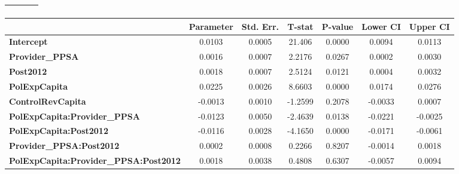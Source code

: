 \begin{center}
\begin{tabular}{lclc}
\textbf{}                                     &                    & \textbf{                     }   &                  \\
\bottomrule
\end{tabular}
\begin{tabular}{lcccccc}
                                              & \textbf{Parameter} & \textbf{Std. Err.} & \textbf{T-stat} & \textbf{P-value} & \textbf{Lower CI} & \textbf{Upper CI}  \\
\midrule
\textbf{Intercept}                            &       0.0103       &       0.0005       &      21.406     &      0.0000      &       0.0094      &       0.0113       \\
\textbf{Provider\_PPSA}                       &       0.0016       &       0.0007       &      2.2176     &      0.0267      &       0.0002      &       0.0030       \\
\textbf{Post2012}                             &       0.0018       &       0.0007       &      2.5124     &      0.0121      &       0.0004      &       0.0032       \\
\textbf{PolExpCapita}                         &       0.0225       &       0.0026       &      8.6603     &      0.0000      &       0.0174      &       0.0276       \\
\textbf{ControlRevCapita}                     &      -0.0013       &       0.0010       &     -1.2599     &      0.2078      &      -0.0033      &       0.0007       \\
\textbf{PolExpCapita:Provider\_PPSA}          &      -0.0123       &       0.0050       &     -2.4639     &      0.0138      &      -0.0221      &      -0.0025       \\
\textbf{PolExpCapita:Post2012}                &      -0.0116       &       0.0028       &     -4.1650     &      0.0000      &      -0.0171      &      -0.0061       \\
\textbf{Provider\_PPSA:Post2012}              &       0.0002       &       0.0008       &      0.2266     &      0.8207      &      -0.0014      &       0.0018       \\
\textbf{PolExpCapita:Provider\_PPSA:Post2012} &       0.0018       &       0.0038       &      0.4808     &      0.6307      &      -0.0057      &       0.0094       \\
\bottomrule
\end{tabular}
\end{center}